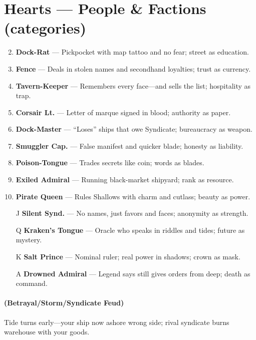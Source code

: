 \section*{Hearts --- People \& Factions (categories)}
\label{sec:zakov-people}
\begin{enumerate}
\setcounter{enumi}{1}
\item \textbf{Dock-Rat} --- Pickpocket with map tattoo and no fear; street as education.
\item \textbf{Fence} --- Deals in stolen names and secondhand loyalties; trust as currency.
\item \textbf{Tavern-Keeper} --- Remembers every face---and sells the list; hospitality as trap.
\item \textbf{Corsair Lt.} --- Letter of marque signed in blood; authority as paper.
\item \textbf{Dock-Master} --- ``Loses'' ships that owe Syndicate; bureaucracy as weapon.
\item \textbf{Smuggler Cap.} --- False manifest and quicker blade; honesty as liability.
\item \textbf{Poison-Tongue} --- Trades secrets like coin; words as blades.
\item \textbf{Exiled Admiral} --- Running black-market shipyard; rank as resource.
\item \textbf{Pirate Queen} --- Rules Shallows with charm and cutlass; beauty as power.
\item[J] \textbf{Silent Synd.} --- No names, just favors and faces; anonymity as strength.
\item[Q] \textbf{Kraken's Tongue} --- Oracle who speaks in riddles and tides; future as mystery.
\item[K] \textbf{Salt Prince} --- Nominal ruler; real power in shadows; crown as mask.
\item[A] \textbf{Drowned Admiral} --- Legend says still gives orders from deep; death as command.
\end{enumerate}

\paragraph*{(Betrayal/Storm/Syndicate Feud)} Tide turns early---your ship now ashore wrong side; rival syndicate burns warehouse with your goods.

